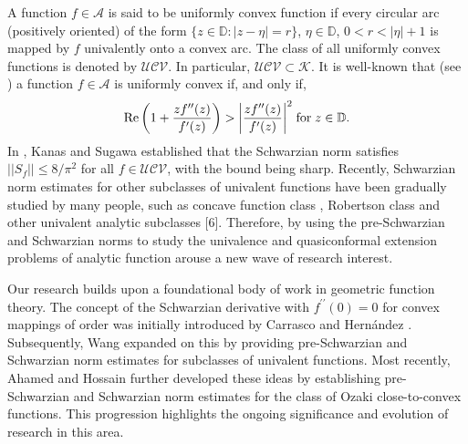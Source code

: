 \documentclass[a4paper,12pt]{amsart}
\theoremstyle{plain}
\theoremstyle{definition}
\theoremstyle{plain}
\newcounter {own}
\begin{document}
A function $f\in\mathcal{A}$ is said to be uniformly convex function if every circular arc (positively oriented) of the form $\{z\in\mathbb{D} : |z-\eta|=r\}$, $\eta\in\mathbb{D}$, $0<r<|\eta|+1$ is mapped by $f$ univalently onto a convex arc. The class of all uniformly convex functions is denoted by $\mathcal{UCV}$. In particular, $\mathcal{UCV}\subset \mathcal{K}$. It is well-known that (see \cite{Goodman-APM-1991}) a function $f\in\mathcal{A}$ is uniformly convex if, and only if, 
\begin{align*}
	{\rm Re}\left(1+\frac{z f^{\prime\prime}(z)}{f^{\prime}(z)}\right)>\bigg|\frac{z f^{\prime\prime}(z)}{f^{\prime}(z)}\bigg|^2\; \mbox{for}\; z\in\mathbb{D}.
\end{align*}
In \cite{Kanas-Sugawa-APM-2011}, Kanas and Sugawa established that the Schwarzian norm satisfies \( ||S_f|| \leq 8/\pi^2 \) for all \( f \in \mathcal{UCV} \), with the bound being sharp.  Recently, Schwarzian norm estimates for other subclasses of univalent functions have been gradually studied by many people, such as concave function class \cite{Bhowmik-Wriths-CM-2012}, Robertson class \cite{Ali-Pal-BDS-2023} and other univalent analytic subclasses [6]. Therefore, by using the pre-Schwarzian  and Schwarzian norms to study the univalence and quasiconformal extension problems of analytic function arouse a new wave of research interest.\vspace{2mm}


Our research builds upon a foundational body of work in geometric function theory. The concept of the Schwarzian derivative with $f^{\prime\prime}(0)=0$ for convex mappings of order was initially introduced by Carrasco and Hern\'andez \cite{Carrasco-Hernández-AMP-2023}. Subsequently, Wang \cite{Wang-Li-Fan-MM-2024} expanded on this by providing pre-Schwarzian and Schwarzian norm estimates for subclasses of univalent functions. Most recently, Ahamed and Hossain \cite{Ahamed-Hossain-2024} further developed these ideas by establishing pre-Schwarzian and Schwarzian norm estimates for the class of Ozaki close-to-convex functions. This progression highlights the ongoing significance and evolution of research in this area.\vspace*{2mm}




\end{document}
